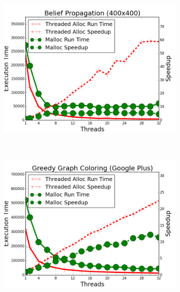 \begin{figure}[h]
        \begin{subfigure}[b]{\smallplotsize\textwidth}
                \includegraphics[width=\textwidth]{experiments/scalability/malloc-allocator-belief-propagation-400.png}
                \label{fig:implementation:malloc_bp}
        \end{subfigure}
        ~
        \begin{subfigure}[b]{\smallplotsize\textwidth}
                \includegraphics[width=\textwidth]{experiments/scalability/malloc-allocator-greedy-graph-coloring-gplus.png}
                \label{fig:implementation:malloc_ggc}
        \end{subfigure}

\end{figure}

